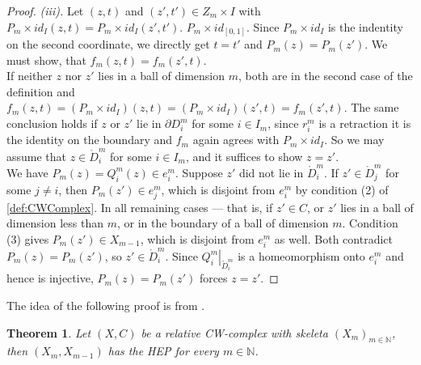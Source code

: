 \documentclass[11pt, a4paper, english]{article}
\newcommand{\interior}[1]{\mathring{#1}}
\renewcommand{\boundary}{\partial}
\newcommand{\restrict}[2]{\left.#1\right|_{#2}}
\newcommand{\openCell}[2]{e^{#1}_{#2}}
\theoremstyle{plain}
\newtheorem{theorem}{Theorem}
\theoremstyle{definition}
\theoremstyle{remark}
\numberwithin{equation}{section}
\numberwithin{theorem}{section}
\begin{document}
\begin{proof}
    \emph{(iii).}
Let $(z,t)$ and $(z',t') \in Z_m \times I$ with $P_m \times id_I (z,t) = P_m \times id_I (z',t')$. $P_m \times id_{[0,1]}$. Since $P_m \times id_I$ is the indentity on the second coordinate, we directly get $t = t'$ and $P_m(z) = P_m(z')$. We must show, that $f_m (z,t) = f_m (z',t)$. \\
If neither $z$ nor $z'$ lies in a ball of dimension $m$, both are in the second case of the definition and $f_m(z,t) = (P_m \times id_I)(z,t) = (P_m \times id_I)(z',t) = f_m(z',t)$. The same conclusion holds if $z$ or $z'$ lie in $\boundary D_i^m$ for some $i \in I_m$, since $r_i^m$ is a retraction it is the identity on the boundary and $f_m$ again agrees with $P_m \times id_I$. So we may assume that $z \in \interior D_i^m$ for some $i \in I_m$, and it suffices to show $z = z'$. \\
We have $P_m (z) = Q_i^m(z) \in \openCell{m}{i}$. Suppose $z'$ did not lie in $\interior D_i^m$. If $z' \in \interior D_j^m$ for some $j \ne i$, then $P_m(z') \in \openCell{m}{j}$, which is disjoint from $\openCell{m}{i}$ by condition (2) of \cref{def:CWComplex}. In all remaining cases — that is, if $z' \in C$, or $z'$ lies in a ball of dimension less than $m$, or in the boundary of a ball of dimension $m$. Condition (3) gives $P_m(z') \in X_{m-1}$, which is disjoint from $\openCell{m}{i}$ as well. Both contradict $P_m(z) = P_m(z')$, so $z' \in \interior D_i^m$. Since $\restrict{Q_i^m}{\interior D_i^m}$ is a homeomorphism onto $\openCell{m}{i}$ and hence is injective, $P_m(z) = P_m(z')$ forces $z = z'$.
\end{proof}

The idea of the following proof is from {\cite[page 40]{WAL}}.
\begin{theorem} \label{thm:HEPskeleton} 
    Let $(X,C)$ be a relative CW-complex with skeleta $(X_m)_{m \in \mathbb{N}}$, then $(X_m,X_{m-1})$ has the \emph{HEP} for every $m \in \mathbb{N}$.
\end{theorem}
\end{document}
